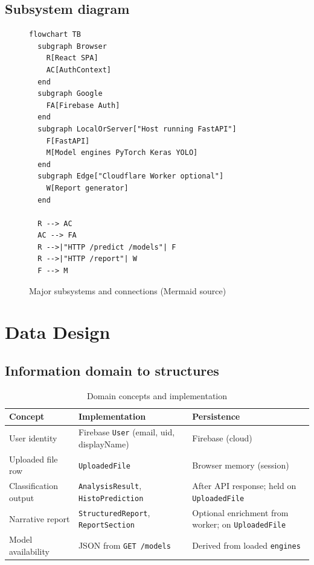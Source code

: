 \documentclass[12pt,a4paper]{report}
\begin{document}
\subsection{Subsystem diagram}

\begin{figure}[htbp]
  \centering
  \begin{verbatim}
flowchart TB
  subgraph Browser
    R[React SPA]
    AC[AuthContext]
  end
  subgraph Google
    FA[Firebase Auth]
  end
  subgraph LocalOrServer["Host running FastAPI"]
    F[FastAPI]
    M[Model engines PyTorch Keras YOLO]
  end
  subgraph Edge["Cloudflare Worker optional"]
    W[Report generator]
  end

  R --> AC
  AC --> FA
  R -->|"HTTP /predict /models"| F
  R -->|"HTTP /report"| W
  F --> M
  \end{verbatim}
  \caption{Major subsystems and connections (Mermaid source)}
\end{figure}

\section{Data Design}
\label{sec:data}

\subsection{Information domain to structures}

\begin{table}[htbp]
  \centering
  \small
  \caption{Domain concepts and implementation}
  \begin{tabular}{@{}p{}p{}p{}@{}}
    \toprule
    \textbf{Concept} & \textbf{Implementation} & \textbf{Persistence} \\
    \midrule
    User identity & Firebase \texttt{User} (email, uid, displayName) & Firebase (cloud) \\
    Uploaded file row & \texttt{UploadedFile} & Browser memory (session) \\
    Classification output & \texttt{AnalysisResult}, \texttt{HistoPrediction} & After API response; held on \texttt{UploadedFile} \\
    Narrative report & \texttt{StructuredReport}, \texttt{ReportSection} & Optional enrichment from worker; on \texttt{UploadedFile} \\
    Model availability & JSON from \texttt{GET /models} & Derived from loaded \texttt{engines} \\
    \bottomrule
  \end{tabular}
\end{table}
\end{document}
